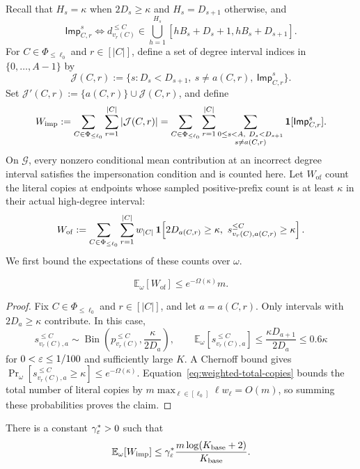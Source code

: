Recall that $H_s=\kappa$ when $2D_s\ge\kappa$ and $H_s=D_{s+1}$ otherwise, and
\[
\mathsf{Imp}^{s}_{C,r}\iff
d_{v_r(C)}^{\le C}\in\bigcup_{h=1}^{H_s}[hB_s+D_s+1,hB_s+D_{s+1}].
\]
For $C\in\Phi_{\le\ell_0}$ and $r\in[|C|]$, define a set of degree interval indices in $\{0,\ldots,A-1\}$ by
\[
\mathcal J(C,r):=
\{s:D_s<D_{s+1},\ s\neq a(C,r),\ \mathsf{Imp}^{s}_{C,r}\}.
\]
Set $\mathcal J'(C,r):=\{a(C,r)\}\cup\mathcal J(C,r)$, and define
\[
W_{\mathrm{imp}}:=
\sum_{C\in\Phi_{\le\ell_0}}\sum_{r=1}^{|C|}|\mathcal J(C,r)|
=\sum_{C\in\Phi_{\le\ell_0}}\sum_{r=1}^{|C|}
\sum_{\substack{0\le s<A,\ D_s<D_{s+1}\\s\neq a(C,r)}}
\mathbf 1[\mathsf{Imp}^{s}_{C,r}].
\]
On $\mathcal G$, every nonzero conditional mean contribution at an incorrect degree interval satisfies the impersonation condition and is counted here.
Let $W_{\mathrm{of}}$ count the literal copies at endpoints whose sampled positive-prefix count is at least $\kappa$ in their actual high-degree interval:
\[
W_{\mathrm{of}}:=
\sum_{C\in\Phi_{\le\ell_0}}\sum_{r=1}^{|C|}w_{|C|}\,
\mathbf 1\!\left[2D_{a(C,r)}\ge\kappa,\
  s_{v_r(C),a(C,r)}^{\le C}\ge\kappa\right].
\]
We first bound the expectations of these counts over $\omega$.

\begin{lemma}\label{lem:maxksat-overflow-weight-bound}
\[
\mathbb E_\omega[W_{\mathrm{of}}]\le e^{-\Omega(\kappa)}m.
\]
\end{lemma}

\begin{proof}
Fix $C\in\Phi_{\le\ell_0}$ and $r\in[|C|]$, and let $a=a(C,r)$.
Only intervals with $2D_a\ge\kappa$ contribute. In this case,
\[
s_{v_r(C),a}^{\le C}\sim
\operatorname{Bin}\!\left(p_{v_r(C)}^{\le C},\frac{\kappa}{2D_a}\right),\qquad
\mathbb E_\omega[s_{v_r(C),a}^{\le C}]
\le\frac{\kappa D_{a+1}}{2D_a}\le0.6\kappa
\]
for $0<\varepsilon\le1/100$ and sufficiently large $K$.
A Chernoff bound gives $\Pr_\omega[s_{v_r(C),a}^{\le C}\ge\kappa]\le e^{-\Omega(\kappa)}$.
Equation~\eqref{eq:weighted-total-copies} bounds the total number of literal copies by $m\max_{\ell\in[\ell_0]}\ell w_\ell=O(m)$, so summing these probabilities proves the claim.
\end{proof}

\begin{lemma}\label{lem:maxksat-impersonation-weight}
There is a constant $\gamma^\ast_\varepsilon>0$ such that
\[
\mathbb E_\omega[W_{\mathrm{imp}}]
\le\gamma^\ast_\varepsilon\frac{m\log(K_{\mathrm{base}}+2)}{K_{\mathrm{base}}}.
\]
\end{lemma}

